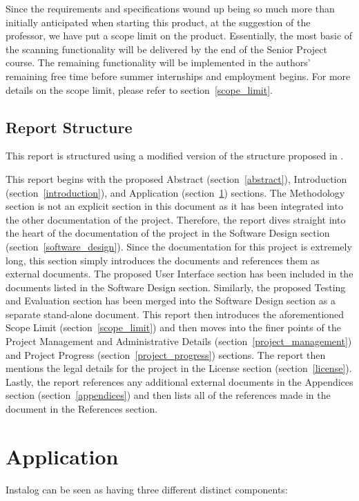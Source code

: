 \documentclass[letterpaper,12pt]{article}
\begin{document}
Since the requirements and specifications wound up being so much more than
initially anticipated when starting this product, at the suggestion of the
professor, we have put a scope limit on the product.  Essentially, the most
basic of the scanning functionality will be delivered by the end of the Senior
Project course.  The remaining functionality will be implemented in the authors'
remaining free time before summer internships and employment begins.  For more
details on the scope limit, please refer to section~\ref{scope_limit}.

\subsection{Report Structure}
This report is structured using a modified version of the structure proposed in
\cite{ReportGuidelines}.

This report begins with the proposed Abstract (section~\ref{abstract}),
Introduction (section~\ref{introduction}), and Application
(section~\ref{application}) sections.  The Methodology section is not an
explicit section in this document as it has been integrated into the other
documentation of the project.  Therefore, the report dives straight into the
heart of the documentation of the project in the Software Design section
(section~\ref{software_design}).  Since the documentation for this project is
extremely long, this section simply introduces the documents and references them
as external documents.  The proposed User Interface section has been included in
the documents listed in the Software Design section.  Similarly, the proposed
Testing and Evaluation section has been merged into the Software Design section
as a separate stand-alone document. This report then introduces the
aforementioned Scope Limit (section~\ref{scope_limit}) and then moves into the
finer points of the Project Management and Administrative Details
(section~\ref{project_management}) and Project Progress
(section~\ref{project_progress}) sections.  The report then mentions the legal
details for the project in the License section (section~\ref{license}).  Lastly,
the report references any additional external documents in the Appendices
section (section~\ref{appendices}) and then lists all of the references made in
the document in the References section.

\newpage



\section{Application} \label{application}
Instalog can be seen as having three different distinct components:
\end{document}

